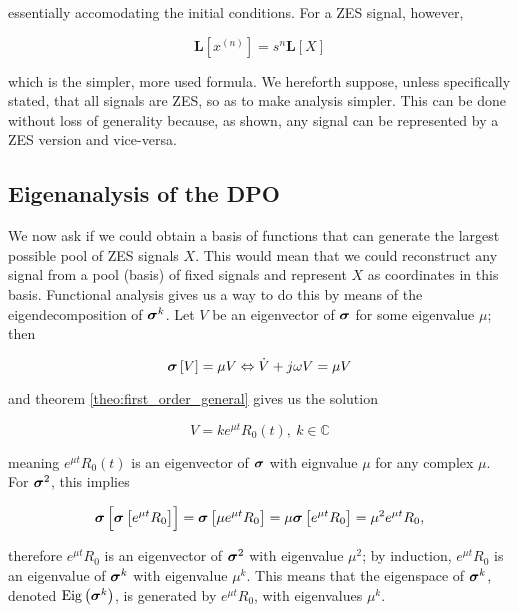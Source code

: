 	\noindent essentially accomodating the initial conditions. For a ZES signal, however, 

\begin{equation} \mathbf{L}\left[x^{(n)}\right] = s^n\mathbf{L}\left[X\right] \end{equation}

	\noindent which is the simpler, more used formula. We hereforth suppose, unless specifically stated, that all signals are ZES, so as to make analysis simpler. This can be done without loss of generality because, as shown, any signal can be represented by a ZES version and vice-versa. 

\subsection{Eigenanalysis of the DPO} %

	We now ask if we could obtain a basis of functions that can generate the largest possible pool of ZES signals $X$. This would mean that we could reconstruct any signal from a pool (basis) of fixed signals and represent $X$ as coordinates in this basis. Functional analysis gives us a way to do this by means of the eigendecomposition of $\boldsymbol{\sigma}^{k}$. Let $V$ be an eigenvector of $\boldsymbol{\sigma}$ for some eigenvalue $\mu$; then

\begin{equation} \boldsymbol{\sigma}\left[V\right] = \mu V \Leftrightarrow \dot{V} + j\omega V = \mu V \end{equation}

	\noindent and theorem \ref{theo:first_order_general} gives us the solution

\begin{equation} V = ke^{\mu t} R_0(t),\ k\in\mathbb{C} \label{eq:dpo_eigen}\end{equation}

	\noindent meaning $e^{\mu t}R_0(t)$ is an eigenvector of $\boldsymbol{\sigma}$ with eignvalue $\mu$ for any complex $\mu$. For $\boldsymbol{\sigma}^{2}$, this implies

\begin{equation} \dpo\left[\raisebox{4mm}{} \dpo\left[e^{\mu t}R_0\right]\right] = \dpo\left[\mu e^{\mu t}R_0\right] = \mu\dpo\left[e^{\mu t}R_0\right] = \mu^2 e^{\mu t}R_0, \end{equation}

	\noindent therefore $e^{\mu t}R_0$ is an eigenvector of $\boldsymbol{\sigma}^2$ with eigenvalue $\mu^2$; by induction, $e^{\mu t}R_0$ is an eigenvalue of $\boldsymbol{\sigma}^{k}$ with eigenvalue $\mu^k$. This means that the eigenspace of $\boldsymbol{\sigma}^{k}$, denoted $\operatorname{Eig}\left(\boldsymbol{\sigma}^{k}\right)$, is generated by $e^{\mu t}R_0$, with eigenvalues $\mu^k$.

